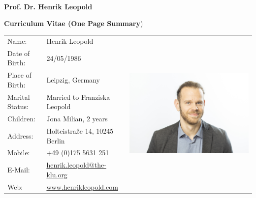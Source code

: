 \centerline{\LARGE{\textbf{Prof. Dr. Henrik Leopold}}}
\vspace{0.2cm}
\centerline{\Large{\textcolor{myred}{\textbf{Curriculum Vitae (One Page Summary}})}}
\vspace{0.5cm}

\begin{tabular}{lP{5.5cm}l}
Name:					&  Henrik Leopold  &  \\
Date of Birth: 		& 24/05/1986 \\
Place of Birth: 		& Leipzig, Germany \\
Marital Status: 		& Married to Franziska Leopold \\
Children:				& Jona Milian, 2 years \\
Address:				& Holteistraße 14, 10245 Berlin \\
Mobile: 				& +49 (0)175 5631 251 \\
E-Mail: 				& \href{mailto:henrik.leopold@the-klu.org}{henrik.leopold@the-klu.org} \\
Web:						& \href{www.henrikleopold.com}{www.henrikleopold.com} \\
\end{tabular}
\vspace{0.5cm}


